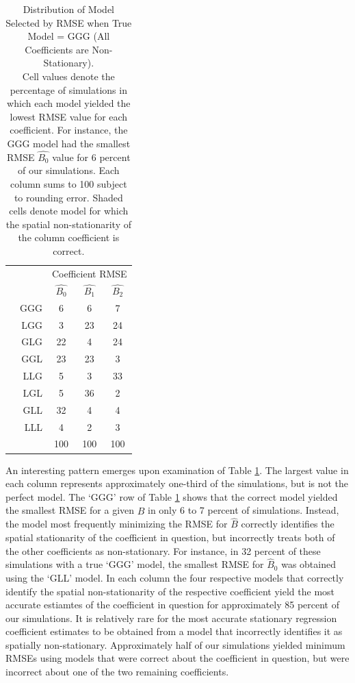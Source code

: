 \documentclass{article}\usepackage[]{graphicx}\usepackage[]{color}
\begin{document}
\begin{table}[htb]
\centering
\begin{tabular}{crccc}
\multicolumn{2}{c}{} & \multicolumn{3}{c}{Coefficient RMSE}  \\ \cline{3-5}
\multicolumn{2}{c}{} & $\widehat{B_0}$ & $\widehat{B_1}$ & \multicolumn{1}{c}{$\widehat{B_2}$}  \\  
 \parbox[t]{2mm}{} & GGG & 6 & 6 & 7 \\ 
& LGG &  3 & 23 & 24 \\ 
&  GLG & 22 & 4 & 24  \\ 
&  GGL & 23 & 23 & 3  \\ 
&  LLG &  5 & 3 & 33 \\ 
&  LGL &  5 &  36 &  2  \\ 
&  GLL &  32 &  4 &  4 \\ 
&  LLL & 4 & 2 & 3 \\ 
&     & 100 & 100 & 100 \\   
\end{tabular}
\caption{Distribution of Model Selected by RMSE when True Model = GGG (All Coefficients are Non-Stationary).\\ Cell values denote the percentage of simulations in which each model yielded the lowest RMSE value for each coefficient. For instance, the GGG model had the smallest RMSE $\widehat{B_0}$ value for 6 percent of our simulations. Each column sums to 100 subject to rounding error. Shaded cells denote model for which the spatial non-stationarity of the column coefficient is correct. } \label{tab:RMSEGGG}
\end{table}

An interesting pattern emerges upon examination of Table \ref{tab:RMSEGGG}. The largest value in each column represents approximately one-third of the simulations, but is not the perfect model. The `GGG' row of Table \ref{tab:RMSEGGG} shows that the correct model yielded the smallest RMSE for a given $\widehat{B}$ in only 6 to 7 percent of simulations.  Instead, the model most frequently minimizing the RMSE for $\widehat{B}$ correctly identifies the spatial stationarity of the coefficient in question, but incorrectly treats both of the other coefficients as non-stationary. For instance, in 32 percent of these simulations with a true `GGG' model, the smallest RMSE for $\widehat{B}_0$ was obtained using the `GLL' model. In each column the four respective models that correctly identify the spatial non-stationarity of the respective coefficient yield the most accurate estiamtes of the coefficient in question for approximately 85 percent of our simulations. It is relatively rare for the most accurate stationary regression coefficient estimates to be obtained from a model that incorrectly identifies it as spatially non-stationary. Approximately half of our simulations yielded minimum RMSEs using models that were correct about the coefficient in question, but were incorrect about one of the two remaining coefficients.
\end{document}
